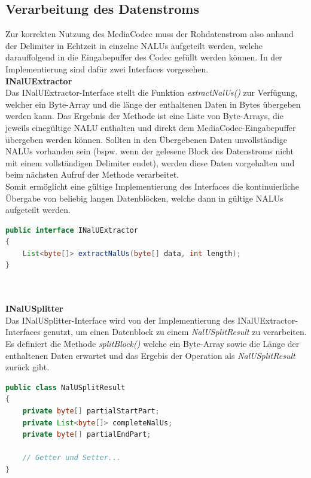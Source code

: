 \subsection{Verarbeitung des Datenstroms}
Zur korrekten Nutzung des MediaCodec muss der Rohdatenstrom also anhand der Delimiter in Echtzeit in einzelne NALUs aufgeteilt werden, welche darauffolgend in die Eingabepuffer des Codec gefüllt werden können. In der Implementierung sind dafür zwei Interfaces vorgesehen.\\
\clearpage
\textbf{INalUExtractor}\\
Das INalUExtractor-Interface stellt die Funktion \textit{extractNalUs()} zur Verfügung, welcher ein Byte-Array und die länge der enthaltenen Daten in Bytes übergeben werden kann. Das Ergebnis der Methode ist eine Liste von Byte-Arrays, die jeweils einegültige NALU enthalten und direkt dem MediaCodec-Eingabepuffer übergeben werden können. Sollten in den Übergebenen Daten unvollständige NALUs vorhanden sein (bspw. wenn der gelesene Block des Datenstroms nicht mit einem vollständigen Delimiter endet), werden diese Daten vorgehalten und beim nächsten Aufruf der Methode verarbeitet.\\
Somit ermöglicht eine gültige Implementierung des Interfaces die kontinuierliche Übergabe von beliebig langen Datenblöcken, welche dann in gültige NALUs aufgeteilt werden.\\
\begin{lstlisting}[caption=Definition des INaluUExtractor-Interface, label=lst:i_nalu_extractor, language=Java]
public interface INalUExtractor
{
    List<byte[]> extractNalUs(byte[] data, int length);
}
\end{lstlisting}
~\\
\\
\textbf{INalUSplitter}\\
Das INalUSplitter-Interface wird von der Implementierung des INalUExtractor-Interfaces genutzt, um einen Datenblock zu einem \textit{NalUSplitResult} zu verarbeiten. Es definiert die Methode \textit{splitBlock()} welche ein Byte-Array sowie die Länge der enthaltenen Daten erwartet und das Ergebis der Operation als \textit{NalUSplitResult} zurück gibt.

\begin{lstlisting}[caption=Definition der NalUSplitResult-Klasse, label=lst:nalu_split_result, language=Java]
public class NalUSplitResult
{
    private byte[] partialStartPart;
    private List<byte[]> completeNalUs;
    private byte[] partialEndPart;
    
    // Getter und Setter...
}
\end{lstlisting}

